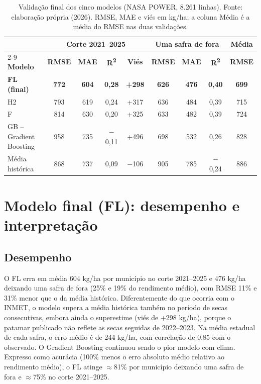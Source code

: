 \documentclass[12pt]{article}
\begin{document}
\begin{table}[ht]
\centering
\caption{Validação final dos cinco modelos (NASA POWER, 8.261 linhas).
  Fonte: elaboração própria (2026). RMSE, MAE e viés em kg/ha; a coluna
  Média é a média do RMSE nas duas validações.}
\label{tab:validacao-final}
\small
\begin{tabular}{|p{3.2cm}|c|c|c|c|c|c|c|c|}
\hline
 & \multicolumn{4}{c|}{\textbf{Corte 2021--2025}} &
   \multicolumn{3}{c|}{\textbf{Uma safra de fora}} & \textbf{Média} \\ \cline{2-9}
\textbf{Modelo} & \textbf{RMSE} & \textbf{MAE} &
  \textbf{R\textsuperscript{2}} & \textbf{Viés} & \textbf{RMSE} &
  \textbf{MAE} & \textbf{R\textsuperscript{2}} & \textbf{RMSE} \\ \hline
\textbf{FL (final)} & \textbf{772} & \textbf{604} & \textbf{0,28} &
  \textbf{+298} & \textbf{626} & \textbf{476} & \textbf{0,40} &
  \textbf{699} \\ \hline
H2 & 793 & 619 & 0,24 & +317 & 636 & 484 & 0,39 & 715 \\ \hline
F & 814 & 630 & 0,20 & +325 & 633 & 482 & 0,39 & 724 \\ \hline
GB -- Gradient Boosting & 958 & 735 & $-$0,11 & +496 & 698 & 532 & 0,26 &
  828 \\ \hline
Média histórica & 868 & 737 & 0,09 & $-$106 & 905 & 785 & $-$0,24 & 886
  \\ \hline
\end{tabular}
\end{table}

\section{Modelo final (FL): desempenho e interpretação}

\subsection{Desempenho}

O FL erra em média 604 kg/ha por município no corte 2021--2025 e 476
kg/ha deixando uma safra de fora (25\% e 19\% do rendimento médio), com
RMSE 11\% e 31\% menor que o da média histórica. Diferentemente do que
ocorria com o INMET, o modelo supera a média histórica também no período
de secas consecutivas, embora ainda o superestime (viés de +298 kg/ha),
porque o patamar publicado não reflete as secas seguidas de 2022--2023.
Na média estadual de cada safra, o erro médio é de 244 kg/ha, com
correlação de 0,85 com o observado. O Gradient Boosting continuou sendo o
pior modelo com clima. Expresso como acurácia (100\% menos o erro absoluto
médio relativo ao rendimento médio), o FL atinge $\approx$81\% por
município deixando uma safra de fora e $\approx$75\% no corte 2021--2025.
\end{document}
